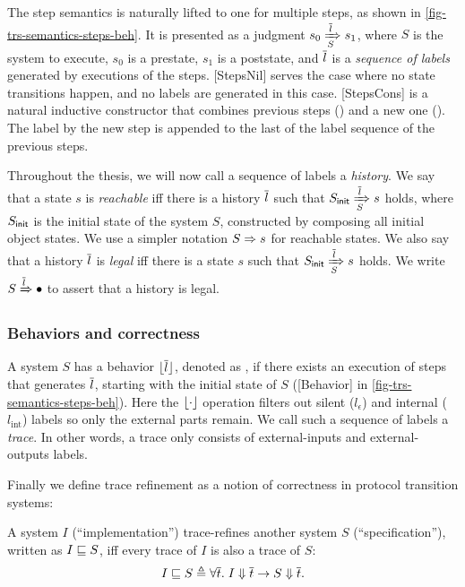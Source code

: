 The step semantics is naturally lifted to one for multiple steps, as shown in \autoref{fig-trs-semantics-steps-beh}.
It is presented as a judgment $\semsteps{S}{s_0}{\listof{l}}{s_1}$, where $S$ is the system to execute, $s_0$ is a prestate, $s_1$ is a poststate, and $\listof{l}$ is a \emph{sequence of labels} generated by executions of the steps.
[StepsNil] serves the case where no state transitions happen, and no labels are generated in this case.
[StepsCons] is a natural inductive constructor that combines previous steps () and a new one ().
The label by the new step is appended to the last of the label sequence of the previous steps.

Throughout the thesis, we will now call a sequence of labels a \emph{history}.
We say that a state $s$ is \emph{reachable} iff there is a history $\listof{l}$ such that $\semsteps{S}{\sysInit{S}}{\listof{l}}{s}$ holds, where $\sysInit{S}$ is the initial state of the system $S$, constructed by composing all initial object states.
We use a simpler notation $\semrch{S}{s}$ for reachable states.
We also say that a history $\listof{l}$ is \emph{legal} iff there is a state $s$ such that $\semsteps{S}{\sysInit{S}}{\listof{l}}{s}$ holds.
We write $\semleg{S}{\listof{l}}$ to assert that a history is legal.

\subsubsection{Behaviors and correctness}

A system $S$ has a behavior $\behOf{\listof{l}}$, denoted as , if there exists an execution of steps that generates $\listof{l}$, starting with the initial state of $S$ ([Behavior] in \autoref{fig-trs-semantics-steps-beh}).
Here the $\behOf{\cdot}$ operation filters out silent ($l_\epsilon$) and internal ($l_{\textrm{int}}$) labels so only the external parts remain.
We call such a sequence of labels a \emph{trace}.
In other words, a trace only consists of external-inputs and external-outputs labels.

Finally we define trace refinement as a notion of correctness in protocol transition systems:
\begin{definition}
  A system $I$ (``implementation'') trace-refines another system $S$ (``specification''), written as $\refines{I}{S}$, iff every trace of $I$ is also a trace of $S$:
  \begin{displaymath}
    \refines{I}{S} \triangleq \forall \listof{t}.\; \sembeh{I}{\listof{t}} \to \sembeh{S}{\listof{t}}.
  \end{displaymath}
\end{definition}

